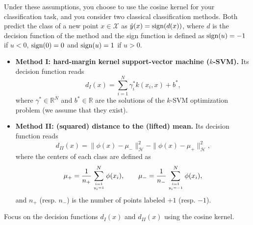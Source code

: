 Under these assumptions, you choose to use the cosine kernel for your classification task, and you consider two classical classification methods. Both predict the class of a new point $x \in \mathcal{X}$ as $\hat{y}(x) = \operatorname{sign}(d(x))$, where $d$ is the decision function of the method and the sign function is defined as $\operatorname{sign}(u) = -1$ if $u<0$, $\operatorname{sign}(0) = 0$ and $\operatorname{sign}(u) = 1$ if $u>0$.
\begin{itemize}
    \item \textbf{Method I: hard-margin kernel support-vector machine ($k$-SVM).} Its decision function reads
    \[
    d_{I}(x) = \sum_{i=1}^N \gamma_i^* k(x_i, x) + b^*,
    \]
    where $\gamma^* \in \mathbb{R}^N$ and $b^* \in \mathbb{R}$ are the solutions of the $k$-SVM optimization problem (we assume that they exist).
    \item \textbf{Method II: (squared) distance to the (lifted) mean.} Its decision function reads
    \[
    d_{II}(x) = \|\phi(x) - \mu_-\|_{\mathcal{H}}^2 - \|\phi(x) - \mu_+\|_{\mathcal{H}}^2,
    \]
    where the centers of each class are defined as
    \[
    \mu_+ = \frac{1}{n_+} \sum_{i = 1 \atop y_i = 1}^N \phi(x_i),
    \qquad
    \mu_- = \frac{1}{n_-} \sum_{i = 1 \atop y_i = -1}^N \phi(x_i),
    \]
    and $n_+$ (resp. $n_-$) is the number of points labeled $+1$ (resp. $-1$).
\end{itemize}
\newpage
Focus on the decision functions $d_{I}(x)$ and $d_{II}(x)$ using the cosine kernel.
